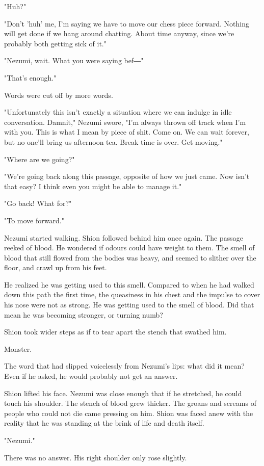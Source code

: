 "Huh?"~

"Don't 'huh' me, I'm saying we have to move our chess piece forward.
Nothing will get done if we hang around chatting. About time anyway,
since we're probably both getting sick of it."

"Nezumi, wait. What you were saying bef―"

"That's enough."

Words were cut off by more words.

"Unfortunately this isn't exactly a situation where we can indulge in
idle conversation. Damnit," Nezumi swore, "I'm always thrown off track
when I'm with you. This is what I mean by piece of shit. Come on. We can
wait forever, but no one'll bring us afternoon tea. Break time is over.
Get moving."

"Where are we going?"

"We're going back along this passage, opposite of how we just came. Now
isn't that easy? I think even you might be able to manage it."

"Go back! What for?"

"To move forward."

Nezumi started walking. Shion followed behind him once again. The
passage reeked of blood. He wondered if odours could have weight to
them. The smell of blood that still flowed from the bodies was heavy,
and seemed to slither over the floor, and crawl up from his feet.

He realized he was getting used to this smell. Compared to when he had
walked down this path the first time, the queasiness in his chest and
the impulse to cover his nose were not as strong. He was getting used to
the smell of blood. Did that mean he was becoming stronger, or turning
numb?

Shion took wider steps as if to tear apart the stench that swathed him.

Monster.

The word that had slipped voicelessly from Nezumi's lips: what did it
mean? Even if he asked, he would probably not get an answer.

Shion lifted his face. Nezumi was close enough that if he stretched, he
could touch his shoulder. The stench of blood grew thicker. The groans
and screams of people who could not die came pressing on him. Shion was
faced anew with the reality that he was standing at the brink of life
and death itself.

"Nezumi."

There was no answer. His right shoulder only rose slightly.

